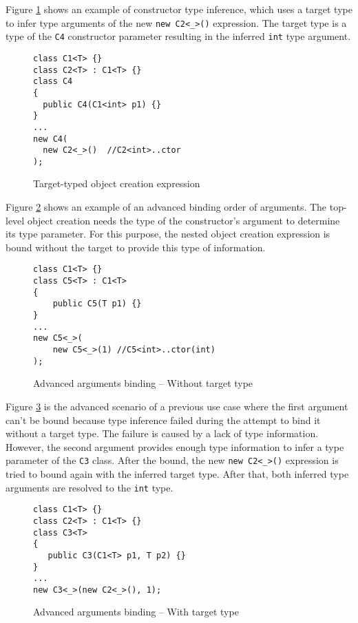 \par
Figure \ref{img76:example4} shows an example of constructor type inference, which uses a target type to infer type arguments of the new \texttt{new C2<\_>()} expression. 
The target type is a type of the \texttt{C4} constructor parameter resulting in the inferred \texttt{int} type argument.
\begin{figure}[h]
\begin{lstlisting}[style=csharp, showstringspaces=false]
class C1<T> {}
class C2<T> : C1<T> {}
class C4 
{
  public C4(C1<int> p1) {}
}
...
new C4(
  new C2<_>()  //C2<int>..ctor
);
\end{lstlisting}
\caption{Target-typed object creation expression}
\label{img76:example4}
\end{figure}
\par
Figure \ref{img77:example5} shows an example of an advanced binding order of arguments. 
The top-level object creation needs the type of the constructor’s argument to determine its type parameter. 
For this purpose, the nested object creation expression is bound without the target to provide this type of information.
\begin{figure}[h]
\begin{lstlisting}[style=csharp, showstringspaces=false]
class C1<T> {}
class C5<T> : C1<T>
{
    public C5(T p1) {}
}
...
new C5<_>(
    new C5<_>(1) //C5<int>..ctor(int)
);
\end{lstlisting}
\caption{Advanced arguments binding -- Without target type}
\label{img77:example5}
\end{figure}
\par
Figure \ref{img78:example6} is the advanced scenario of a previous use case where the first argument can’t be bound because type inference failed during the attempt to bind it without a target type.
The failure is caused by a lack of type information. 
However, the second argument provides enough type information to infer a type parameter of the \texttt{C3} class. 
After the bound, the new \texttt{new C2<\_>()} expression is tried to bound again with the inferred target type.
After that, both inferred type arguments are resolved to the \texttt{int} type.
\begin{figure}[h]
\begin{lstlisting}[style=csharp, showstringspaces=false]
class C1<T> {}
class C2<T> : C1<T> {}
class C3<T>
{
   public C3(C1<T> p1, T p2) {}
}
...
new C3<_>(new C2<_>(), 1);
\end{lstlisting}
\caption{Advanced arguments binding -- With target type}
\label{img78:example6}
\end{figure}
